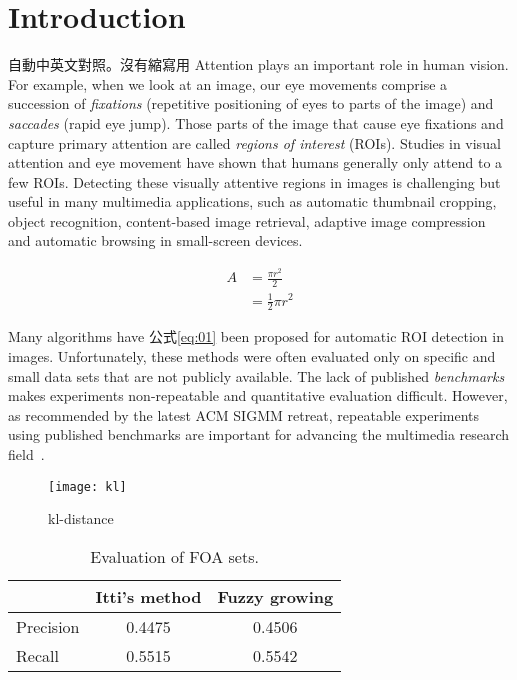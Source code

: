 \chapter{Introduction}
\label{c:intro}


自動中英文對照。沒有縮寫用
Attention plays an important role in human vision. For example, when
we look at an image, our eye movements comprise a succession of {\em
fixations} (repetitive positioning of eyes to parts of the image)
and {\em saccades} (rapid eye jump). Those parts of the image that
cause eye fixations and capture primary attention are called {\em
regions of interest} (ROIs). Studies in visual attention and eye
movement have shown that humans generally only attend to a few ROIs.
Detecting these visually attentive regions in images is challenging
but useful in many multimedia applications, such as automatic
thumbnail cropping, object recognition, content-based image
retrieval, adaptive image compression and automatic browsing in
small-screen devices.\cite{vinet1989universal}

\begin{equation} \label{eq:01}
\begin{split}
A & = \frac{\pi r^2}{2} \\
& = \frac{1}{2} \pi r^2
\end{split}
\end{equation}

Many algorithms have 公式\ref{eq:01} been proposed for automatic ROI detection in
images. Unfortunately, these methods were often evaluated only on
specific and small data sets that are not publicly available. The
lack of published {\em benchmarks} makes experiments non-repeatable
and quantitative evaluation difficult. However, as recommended by
the latest ACM SIGMM retreat, repeatable experiments using published
benchmarks are important for advancing the multimedia research
field~\cite{Rowe:2005:ASR}.

\begin{figure}
	\centering
	\texttt{[image: kl]}
	\caption{kl-distance\cite{Rowe:2005:ASR}}
	\label{kl}
\end{figure}

\begin{table}[t]
\begin{center}
\begin{tabular}{lcc}

\hline
                    &  {\small Itti's method}     & {\small Fuzzy growing}    \\
\hline
{\small Precision}           &  0.4475    & 0.4506 \\
{\small Recall}              &  0.5515    & 0.5542 \\
\hline

\end{tabular}
\caption[Evaluation of FOA sets]{\small Evaluation of FOA sets. } \label{t:FOA}
\end{center}
\end{table}


